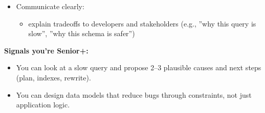 \begin{itemize}
\begin{itemize}
        \item avoid N+1 patterns across app $\leftrightarrow$ DB boundaries
        \item reason about idempotency and safe retries (application + DB)
    \end{itemize}
    \newpage
    \item Communicate clearly:
    \begin{itemize}
        \item explain tradeoffs to developers and stakeholders (e.g., ''why this query is slow'', 
        ''why this schema is safer'')
    \end{itemize}
\end{itemize}

\textbf{Signals you're Senior+:}
\begin{itemize}
    \item You can look at a slow query and propose 2--3 plausible causes and next steps 
    (plan, indexes, rewrite).
    \item You can design data models that reduce bugs through constraints, not just application logic.
\end{itemize}

